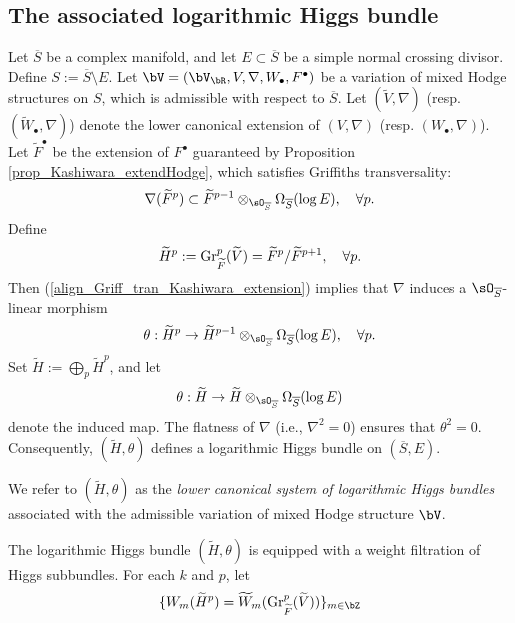 \documentclass[11pt,letterpaper]{amsart}
\numberwithin{equation}{section}
\begin{document}
	\subsection{The associated logarithmic Higgs bundle}\label{section_lHB_BM}
	Let $\overline{S}$ be a complex manifold, and let $E \subset \overline{S}$ be a simple normal crossing divisor. Define $S := \overline{S} \setminus E$. Let $\bV = (\bV_{\bR}, V, \nabla, W_\bullet, F^\bullet)$ be a variation of mixed Hodge structures on $S$, which is admissible with respect to $\overline{S}$.	
	Let $(\widetilde{V}, \nabla)$ (resp. $(\widetilde{W}_\bullet, \nabla)$) denote the lower canonical extension of $(V, \nabla)$ (resp. $(W_\bullet, \nabla)$). Let $\widetilde{F}^\bullet$ be the extension of $F^\bullet$ guaranteed by Proposition \ref{prop_Kashiwara_extendHodge}, which satisfies Griffiths transversality:  
	\begin{align}\label{align_Griff_tran_Kashiwara_extension}  
		\nabla(\widetilde{F}^p) \subset \widetilde{F}^{p-1} \otimes_{\sO_{\overline{S}}} \Omega_{\overline{S}}(\log E), \quad \forall p.
	\end{align}  
	Define  
	$$
	\widetilde{H}^{p} := {\rm Gr}_{\widetilde{F}}^p(\widetilde{V}) = \widetilde{F}^p/\widetilde{F}^{p+1}, \quad \forall p.
	$$  
	Then (\ref{align_Griff_tran_Kashiwara_extension}) implies that $\nabla$ induces a $\sO_{\overline{S}}$-linear morphism  
	\begin{align}\label{align_logtheta_BM}  
		\theta: \widetilde{H}^{p} \to \widetilde{H}^{p-1} \otimes_{\sO_{\overline{S}}} \Omega_{\overline{S}}(\log E), \quad \forall p.
	\end{align}  
	Set $\widetilde{H} := \bigoplus_{p} \widetilde{H}^{p}$, and let  
	$$
	\theta: \widetilde{H} \to \widetilde{H} \otimes_{\sO_{\overline{S}}} \Omega_{\overline{S}}(\log E)
	$$  
	denote the induced map. The flatness of $\nabla$ (i.e., $\nabla^2 = 0$) ensures that $\theta^2 = 0$. Consequently, $(\widetilde{H}, \theta)$ defines a logarithmic Higgs bundle on $(\overline{S}, E)$.
	\begin{defn}\label{defn_LHB_ass_VHSBM}  
		We refer to $(\widetilde{H}, \theta)$ as the \emph{lower canonical system of logarithmic Higgs bundles} associated with the admissible variation of mixed Hodge structure $\bV$.  
	\end{defn}
	The logarithmic Higgs bundle $(\widetilde{H}, \theta)$ is equipped with a weight filtration of Higgs subbundles. For each $k$ and $p$, let  
	$$  
	\{W_m(\widetilde{H}^p) = \widetilde{W}_m({\rm Gr}_{\widetilde{F}}^p(\widetilde{V}))\}_{m \in \bZ}  
	$$  
\end{document}
